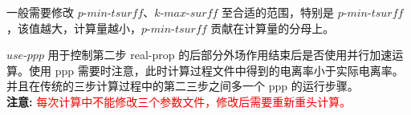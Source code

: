 一般需要修改 $p\mbox{-}min\mbox{-}tsurff$、$k\mbox{-}max\mbox{-}surff$ 至合适的范围，特别是 $p\mbox{-}min\mbox{-}tsurff$，该值越大，计算量越小，$p\mbox{-}min\mbox{-}tsurff$ 贡献在计算量的分母上。

$use\mbox{-}ppp$ 用于控制第二步 real-prop 的后部分外场作用结束后是否使用并行加速运算。使用 ppp 需要时注意，此时计算过程文件中得到的电离率小于实际电离率。并且在传统的三步计算过程中的第二三步之间多一个 ppp 的运行步骤。
\\

\textbf{注意:}
\textcolor{red}{每次计算中不能修改三个参数文件，修改后需要重新重头计算。}
